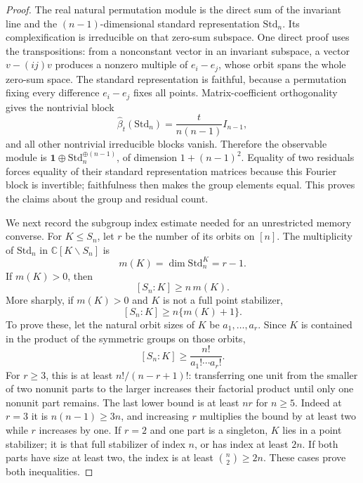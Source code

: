 \begin{proof}
The real natural permutation module is the direct sum of the
invariant line and the $(n-1)$-dimensional standard representation
$\mathrm{Std}_n$. Its complexification is irreducible on that
zero-sum subspace. One direct proof uses the transpositions: from
a nonconstant vector in an invariant subspace, a vector
$v-(ij)v$ produces a nonzero multiple of $e_i-e_j$, whose orbit
spans the whole zero-sum space. The standard representation is
faithful, because a permutation fixing every difference $e_i-e_j$
fixes all points. Matrix-coefficient orthogonality gives the
nontrivial block
\[
 \widehat\beta_t(\mathrm{Std}_n)
   =\frac{t}{n(n-1)}I_{n-1},
\]
and all other nontrivial irreducible blocks vanish. Therefore the
observable module is
$\boldsymbol1\oplus\mathrm{Std}_n^{\oplus(n-1)}$, of dimension
$1+(n-1)^2$. Equality of two residuals forces equality of their
standard representation matrices because this Fourier block is
invertible; faithfulness then makes the group elements equal.
This proves the claims about the group and residual count.

We next record the subgroup index estimate needed for an unrestricted
memory converse. For $K\le S_n$, let $r$ be the number of its orbits
on $[n]$. The multiplicity of $\mathrm{Std}_n$ in
$\mathbb C[K\backslash S_n]$ is
\[
 m(K)=\dim\mathrm{Std}_n^K=r-1.
\]
If $m(K)>0$, then
\begin{equation}\label{eq:r75-index-estimate}
 [S_n:K]\ge n\,m(K).
\end{equation}
More sharply, if $m(K)>0$ and $K$ is not a full point stabilizer,
\begin{equation}\label{eq:r75-index-extra}
 [S_n:K]\ge n\{m(K)+1\}.
\end{equation}
To prove these, let the natural orbit sizes of $K$ be
$a_1,\ldots,a_r$. Since $K$ is contained in the product of the
symmetric groups on those orbits,
\[
 [S_n:K]\ge\frac{n!}{a_1!\cdots a_r!}.
\]
For $r\ge3$, this is at least $n!/(n-r+1)!$: transferring one
unit from the smaller of two nonunit parts to the larger increases
their factorial product until only one nonunit part remains. The
last lower bound is at least $nr$ for $n\ge5$. Indeed at $r=3$
it is $n(n-1)\ge3n$, and increasing $r$ multiplies the bound by
at least two while $r$ increases by one. If $r=2$ and one part
is a singleton, $K$ lies in a point stabilizer; it is that full
stabilizer of index $n$, or has index at least $2n$. If both
parts have size at least two, the index is at least
$\binom n2\ge2n$. These cases prove both inequalities.


\end{proof}
